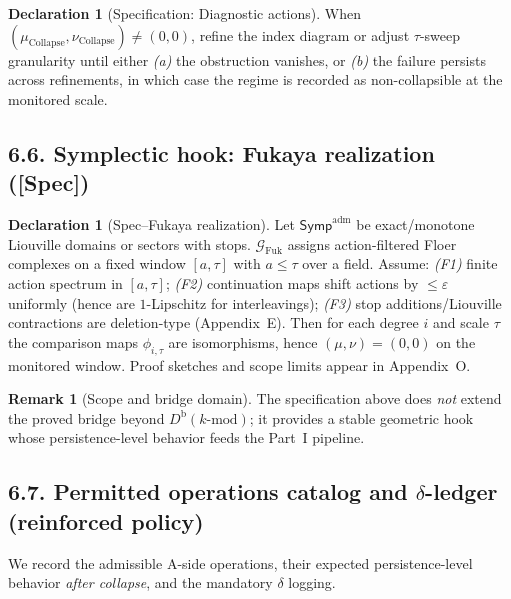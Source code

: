 \documentclass[11pt]{article}
\DeclareRobustCommand{\hyp}{\nobreakdash-}
\numberwithin{equation}{section}
\theoremstyle{definition}
\newtheorem{remark}[theorem]{Remark}
\newtheorem{declaration}[theorem]{Declaration}
\DeclareRobustCommand{\muc}{\mu_{\mathrm{Collapse}}}
\DeclareRobustCommand{\nuc}{\nu_{\mathrm{Collapse}}}
\begin{document}
\begin{declaration}[Specification: Diagnostic actions]\label{spec:diagnostic}
When \((\muc,\nuc)\neq(0,0)\), refine the index diagram or adjust \(\tau\)\hyp sweep granularity until either \emph{(a)} the obstruction vanishes, or \emph{(b)} the failure persists across refinements, in which case the regime is recorded as non\hyp collapsible at the monitored scale.
\end{declaration}

\subsection*{6.6. Symplectic hook: Fukaya realization (\textbf{[Spec]})}
\begin{declaration}[Spec--Fukaya realization]\label{spec:fukaya}
Let \(\mathsf{Symp}^{\mathrm{adm}}\) be exact/monotone Liouville domains or sectors with stops.
\(\mathcal{G}_{\mathrm{Fuk}}\) assigns action\hyp filtered Floer complexes on a fixed window \([a,\tau]\) with \(a\le \tau\) over a field.
Assume:
\emph{(F1)} finite action spectrum in \([a,\tau]\);
\emph{(F2)} continuation maps shift actions by \(\le\varepsilon\) uniformly (hence are \(1\)\hyp Lipschitz for interleavings);
\emph{(F3)} stop additions/Liouville contractions are deletion\hyp type (Appendix~E).
Then for each degree \(i\) and scale \(\tau\) the comparison maps \(\phi_{i,\tau}\) are isomorphisms, hence \((\mu,\nu)=(0,0)\) on the monitored window.
Proof sketches and scope limits appear in Appendix~O.
\end{declaration}

\begin{remark}[Scope and bridge domain]
The specification above does \emph{not} extend the proved bridge beyond \(D^{\mathrm{b}}(k\text{-mod})\);
it provides a stable geometric hook whose persistence\hyp level behavior feeds the Part~I pipeline.
\end{remark}

\subsection*{6.7. Permitted operations catalog and $\delta$-ledger (reinforced policy)}\label{subsec:ops-delta}
We record the admissible A\hyp side operations, their expected persistence\hyp level behavior \emph{after collapse}, and the mandatory $\delta$ logging.
\end{document}
